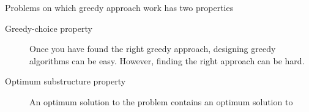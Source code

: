 Problems on which greedy approach work has two properties



\begin{description}
\item[ Greedy-choice property]  Once you have found the  right greedy approach, designing 
greedy algorithms can be easy. However, finding the right approach can be hard.
\item[Optimum substructure property] 
An optimum solution to the problem contains an optimum solution to




\end{description}
